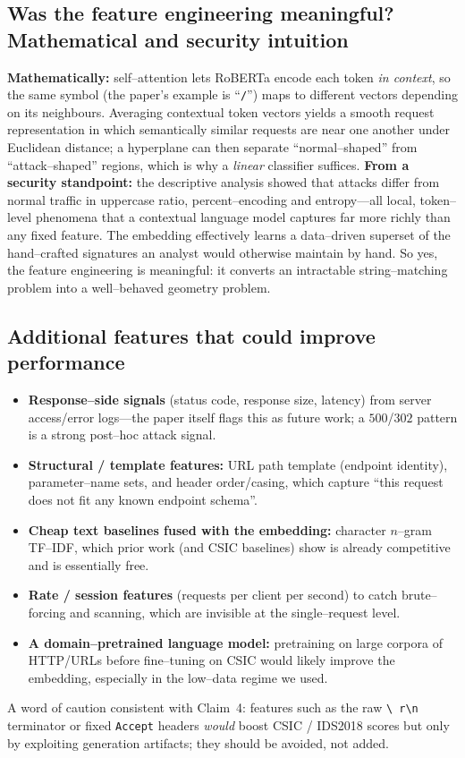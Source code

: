 \documentclass[11pt,a4paper]{article}
\begin{document}
\subsection{Was the feature engineering meaningful? Mathematical and security intuition}
\textbf{Mathematically:} self--attention lets RoBERTa encode each token \emph{in
context}, so the same symbol (the paper's example is ``\texttt{/}'') maps to different
vectors depending on its neighbours. Averaging contextual token vectors yields a smooth
request representation in which semantically similar requests are near one another under
Euclidean distance; a hyperplane can then separate ``normal--shaped'' from
``attack--shaped'' regions, which is why a \emph{linear} classifier suffices.
\textbf{From a security standpoint:} the descriptive analysis showed that attacks differ
from normal traffic in uppercase ratio, percent--encoding and entropy---all local,
token--level phenomena that a contextual language model captures far more richly than any
fixed feature. The embedding effectively learns a data--driven superset of the
hand--crafted signatures an analyst would otherwise maintain by hand. So yes, the feature
engineering is meaningful: it converts an intractable string--matching problem into a
well--behaved geometry problem.

\subsection{Additional features that could improve performance}
\begin{itemize}[nosep,leftmargin=1.4em]
  \item \textbf{Response--side signals} (status code, response size, latency) from server
        access/error logs---the paper itself flags this as future work; a $500$/$302$
        pattern is a strong post--hoc attack signal.
  \item \textbf{Structural / template features:} URL path template (endpoint identity),
        parameter--name sets, and header order/casing, which capture ``this request does
        not fit any known endpoint schema''.
  \item \textbf{Cheap text baselines fused with the embedding:} character $n$--gram
        TF--IDF, which prior work (and CSIC baselines) show is already competitive and is
        essentially free.
  \item \textbf{Rate / session features} (requests per client per second) to catch
        brute--forcing and scanning, which are invisible at the single--request level.
  \item \textbf{A domain--pretrained language model:} pretraining on large corpora of
        HTTP/URLs before fine--tuning on CSIC would likely improve the embedding,
        especially in the low--data regime we used.
\end{itemize}
A word of caution consistent with Claim~4: features such as the raw \texttt{\textbackslash
r\textbackslash n} terminator or fixed \texttt{Accept} headers \emph{would} boost CSIC /
IDS2018 scores but only by exploiting generation artifacts; they should be avoided, not
added.
\end{document}
